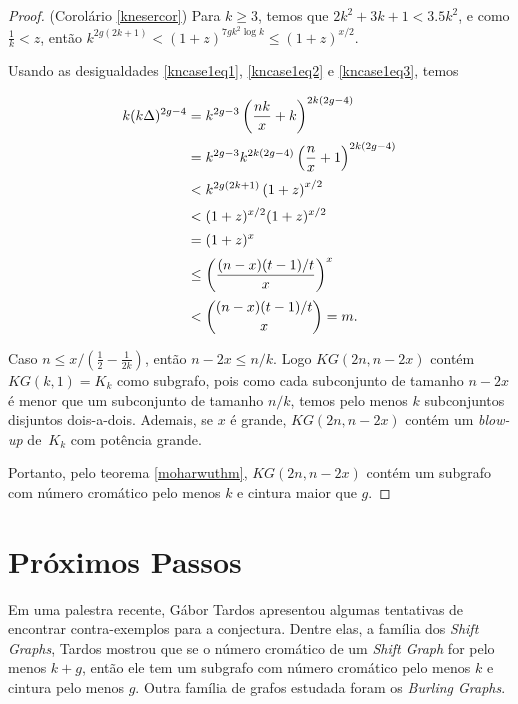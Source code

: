 \documentclass{article}
\begin{document}
\begin{proof}{(Corolário \ref{knesercor})}
Para $k \geq 3$, temos que $2k^2+3k+1<3.5k^2$, e como $\frac{1}{k} < z$, então $k^{2g(2k+1)} < (1+z)^{7gk^2\log k} \leq (1+z)^{x/2}$.

Usando as desigualdades \ref{kncase1eq1}, \ref{kncase1eq2} e \ref{kncase1eq3}, temos


\begin{equation*}
\setlength{\jot}{5pt}
\begin{aligned}
k(k\Delta)^{2g-4} & = k^{2g-3}\left(\frac{nk}{x}+k\right)^{2k(2g-4)} \\
 & = k^{2g-3}k^{2k(2g-4)}\left(\frac{n}{x}+1\right)^{2k(2g-4)} \\
 & < k^{2g(2k+1)}\left(1+z\right)^{x/2}\\
 & < (1+z)^{x/2}(1+z)^{x/2} \\
 & = (1+z)^x \\
 & \leq \left(\frac{(n-x)(t-1)/t}{x}\right)^x \\
 & < \binom{(n-x)(t-1)/t}{x} = m.
\end{aligned}
\end{equation*}

Caso $n \leq x/(\frac{1}{2} - \frac{1}{2k})$, então $n-2x \leq n/k$. Logo $KG(2n,n-2x)$ contém $KG(k,1) = K_k$ como subgrafo, pois como cada subconjunto de tamanho $n-2x$ é menor que um subconjunto de tamanho $n/k$, temos pelo menos $k$ subconjuntos disjuntos dois-a-dois. Ademais, se $x$ é grande, $KG(2n,n-2x)$ contém um \textit{blow-up} de~$K_k$ com potência grande.

Portanto, pelo teorema \ref{moharwuthm}, $KG(2n,n-2x)$ contém um subgrafo com número cromático pelo menos $k$ e cintura maior que $g$.
\end{proof}

\section{Próximos Passos}
Em uma palestra recente, Gábor Tardos apresentou algumas tentativas de encontrar contra-exemplos para a conjectura. Dentre elas, a família dos \textit{Shift Graphs}, Tardos mostrou que se o número cromático de um \textit{Shift Graph} for pelo menos $k+g$, então ele tem um subgrafo com número cromático pelo menos $k$ e cintura pelo menos $g$. Outra família de grafos estudada foram os \textit{Burling Graphs}.
\end{document}
